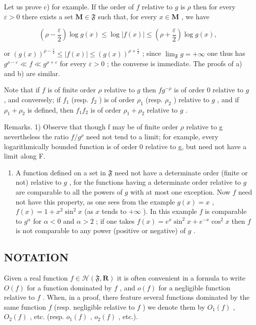 Let us prove c) for example. If the order of \(f\) relative to \(g\) is \(\rho\) then for every \(\varepsilon > 0\) there exists a set \(\mathbf{M} \in \mathfrak{F}\) such that, for every \(x \in \mathbf{M}\) , we have

\[
\left(\rho - \frac {\varepsilon}{2}\right) \log g (x) \leqslant \log | f (x) | \leqslant \left(\rho + \frac {\varepsilon}{2}\right) \log g (x),
\]

or \((g(x))^{\rho-\frac{\varepsilon}{2}} \leqslant |f(x)| \leqslant (g(x))^{\rho+\frac{\varepsilon}{2}}\) ; since \(\lim_{\mathfrak{F}} g = +\infty\) one thus has \(g^{\rho-\varepsilon} \ll f \ll g^{\rho+\varepsilon}\) for every \(\varepsilon > 0\) ; the converse is immediate. The proofs of a) and b) are similar.

Note that if \(f\) is of finite order \(\rho\) relative to \(g\) then \(fg^{-\rho}\) is of order 0 relative to \(g\) , and conversely; if \(f_1\) (resp. \(f_2\) ) is of order \(\rho_1\) (resp. \(\rho_2\) ) relative to \(g\) , and if \(\rho_1 + \rho_2\) is defined, then \(f_1f_2\) is of order \(\rho_1 + \rho_2\) relative to \(g\) .

Remarks. 1) Observe that though f may be of finite order \(\rho\) relative to g nevertheless the ratio \(f/g^{\rho}\) need not tend to a limit; for example, every logarithmically bounded function is of order 0 relative to g, but need not have a limit along F.

\begin{enumerate}
\def\labelenumi{\arabic{enumi})}
\setcounter{enumi}{1}
\tightlist
\item
  A function defined on a set in \(\mathfrak{F}\) need not have a determinate order (finite or not) relative to \(g\) , for the functions having a determinate order relative to \(g\) are comparable to all the powers of \(g\) with at most one exception. Now \(f\) need not have this property, as one sees from the example \(g(x) = x\) , \(f(x) = 1 + x^2 \sin^2 x\) (as \(x\) tends to \(+\infty\) ). In this example \(f\) is comparable to \(g^\alpha\) for \(\alpha < 0\) and \(\alpha > 2\) ; if one takes \(f(x) = e^x \sin^2 x + e^{-x} \cos^2 x\) then \(f\) is not comparable to any power (positive or negative) of \(g\) .
\end{enumerate}

\subsection{NOTATION}

Given a real function \(f \in \mathcal{H}(\mathfrak{F}, \mathbf{R})\) it is often convenient in a formula to write \(O(f)\) for a function dominated by \(f\) , and \(o(f)\) for a negligible function relative to \(f\) . When, in a proof, there feature several functions dominated by the same function \(f\) (resp. negligible relative to \(f\) ) we denote them by \(O_1(f)\) , \(O_2(f)\) , etc. (resp. \(o_1(f)\) , \(o_2(f)\) , etc.).

